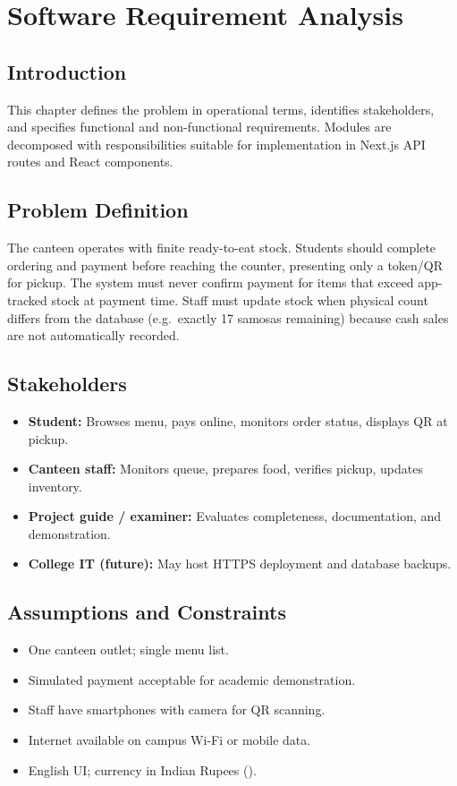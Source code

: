 \chapter{Software Requirement Analysis}

\section{Introduction}
This chapter defines the problem in operational terms, identifies stakeholders, and specifies functional and non-functional requirements. Modules are decomposed with responsibilities suitable for implementation in Next.js API routes and React components.

\section{Problem Definition}
The canteen operates with finite ready-to-eat stock. Students should complete ordering and payment before reaching the counter, presenting only a token/QR for pickup. The system must never confirm payment for items that exceed app-tracked stock at payment time. Staff must update stock when physical count differs from the database (e.g.\ exactly 17 samosas remaining) because cash sales are not automatically recorded.

\section{Stakeholders}
\begin{itemize}
  \item \textbf{Student:} Browses menu, pays online, monitors order status, displays QR at pickup.
  \item \textbf{Canteen staff:} Monitors queue, prepares food, verifies pickup, updates inventory.
  \item \textbf{Project guide / examiner:} Evaluates completeness, documentation, and demonstration.
  \item \textbf{College IT (future):} May host HTTPS deployment and database backups.
\end{itemize}

\section{Assumptions and Constraints}
\begin{itemize}
  \item One canteen outlet; single menu list.
  \item Simulated payment acceptable for academic demonstration.
  \item Staff have smartphones with camera for QR scanning.
  \item Internet available on campus Wi-Fi or mobile data.
  \item English UI; currency in Indian Rupees (\inr).
\end{itemize}

